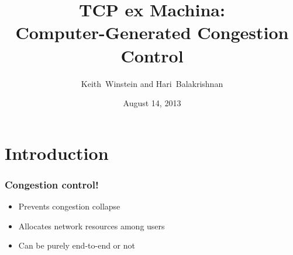 \documentclass[svgnames]{beamer}
\title{TCP ex Machina: \\Computer-Generated Congestion Control}
\author{Keith~Winstein and Hari~Balakrishnan}
\institute{MIT Computer Science and Artificial Intelligence Laboratory}
\date{August 14, 2013}
\begin{document}
\begin{frame}[plain]

\titlepage

\end{frame}

\section{Introduction}

\begin{frame}
\frametitle{Congestion control!}

\begin{itemize}

\Large

\item Prevents congestion collapse

\item Allocates network resources among users

\item Can be purely end-to-end or not

\end{itemize}

\end{frame}
\end{document}
